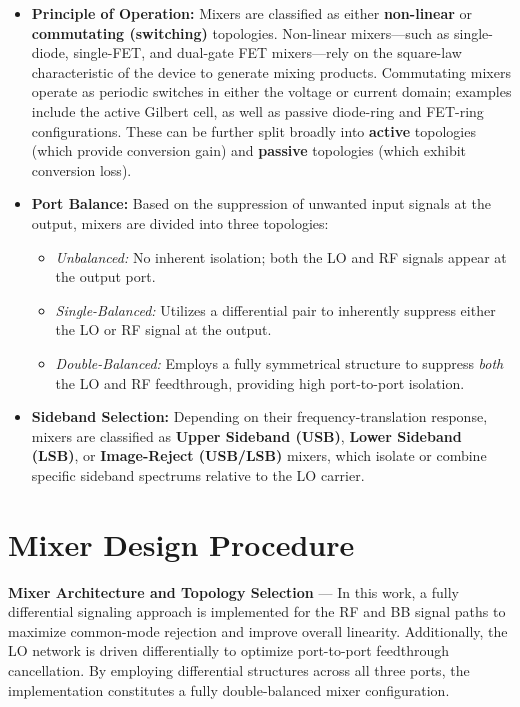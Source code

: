 \begin{itemize}
    \item \textbf{Principle of Operation:} Mixers are classified as either \textbf{non-linear} or \textbf{commutating (switching)} topologies. Non-linear mixers---such as single-diode, single-FET, and dual-gate FET mixers---rely on the square-law characteristic of the device to generate mixing products. Commutating mixers operate as periodic switches in either the voltage or current domain; examples include the active Gilbert cell, as well as passive diode-ring and FET-ring configurations. These can be further split broadly into \textbf{active} topologies (which provide conversion gain) and \textbf{passive} topologies (which exhibit conversion loss).
    \item \textbf{Port Balance:} Based on the suppression of unwanted input signals at the output, mixers are divided into three topologies:
    \begin{itemize}
        \item \emph{Unbalanced:} No inherent isolation; both the LO and RF signals appear at the output port.
        \item \emph{Single-Balanced:} Utilizes a differential pair to inherently suppress either the LO or RF signal at the output.
        \item \emph{Double-Balanced:} Employs a fully symmetrical structure to suppress \emph{both} the LO and RF feedthrough, providing high port-to-port isolation.
    \end{itemize}
    \item \textbf{Sideband Selection:} Depending on their frequency-translation response, mixers are classified as \textbf{Upper Sideband (USB)}, \textbf{Lower Sideband (LSB)}, or \textbf{Image-Reject (USB/LSB)} mixers, which isolate or combine specific sideband spectrums relative to the LO carrier.
\end{itemize}

\section{Mixer Design Procedure}

\textbf{Mixer Architecture and Topology Selection} --- In this work, a fully differential signaling approach is implemented for the RF and BB signal paths to maximize common-mode rejection and improve overall linearity. Additionally, the LO network is driven differentially to optimize port-to-port feedthrough cancellation. By employing differential structures across all three ports, the implementation constitutes a fully double-balanced mixer configuration.


